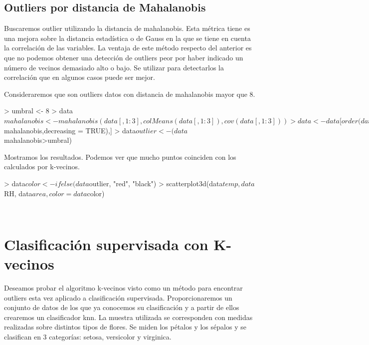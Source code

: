 \documentclass [a4paper] {article}
\begin{document}
\newpage
\subsection{Outliers por distancia de Mahalanobis}
Buscaremos outlier utilizando la distancia de mahalanobis.
Esta métrica tiene es una mejora sobre la distancia estadística o de Gauss en la que se tiene en cuenta la correlación de las variables.
La ventaja de este método respecto del anterior es que no podemos obtener una detección de outliers peor por haber indicado un número de vecinos demasiado alto o bajo.
Se utilizar para detectarlos la correlación que en algunos casos puede ser mejor.

Consideraremos que son outliers datos con distancia de mahalanobis mayor que 8.
\begin{Schunk}
\begin{Sinput}
> umbral <- 8
> data$mahalanobis <- mahalanobis(data[,1:3], colMeans(data[,1:3]), cov(data[,1:3]))
> data <- data[order(data$mahalanobis,decreasing = TRUE),]
> data$outlier <- (data$mahalanobis>umbral)
\end{Sinput}
\end{Schunk}

Mostramos los resultados.
Podemos ver que mucho puntos coinciden con los calculados por k-vecinos.
\begin{center}
\begin{Schunk}
\begin{Sinput}
> data$color <- ifelse(data$outlier, "red", "black")
> scatterplot3d(data$temp, data$RH, data$area,  color = data$color)
\end{Sinput}
\end{Schunk}
\includegraphics{entrega-mahalanobis_plot}
\end{center}

\newpage
\section{Clasificación supervisada con K-vecinos}
Deseamos probar el algoritmo k-vecinos visto como un método para encontrar outliers esta vez aplicado a clasificación supervisada.
Proporcionaremos un conjunto de datos de los que ya conocemos su clasificación y a partir de ellos crearemos un clasificador knn.
La muestra utilizada se corresponden con medidas realizadas sobre distintos tipos de flores.
Se miden los pétalos y los sépalos y se clasifican en 3 categorías: setosa, versicolor y virginica.
\end{document}
